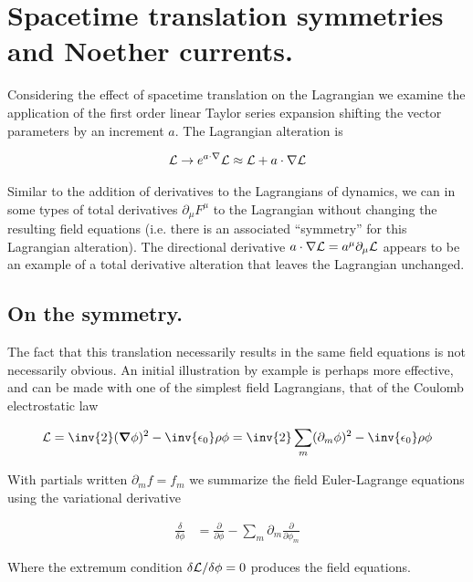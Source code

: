 \section{Spacetime translation symmetries and Noether currents.}

Considering the effect of spacetime translation on the Lagrangian we examine the application of the first order linear Taylor series expansion shifting the vector parameters by an increment $a$.  The Lagrangian alteration is

\begin{align}\label{eqn:rotationCurrents:goo1}
\mathcal{L} \rightarrow e^{a \cdot \nabla }\mathcal{L} \approx \mathcal{L} + a \cdot \nabla \mathcal{L}
\end{align}

Similar to the addition of derivatives to the Lagrangians of dynamics, we can in some types of total derivatives $\partial_\mu F^\mu$ to the Lagrangian without changing the resulting field equations (i.e. there is an associated ``symmetry'' for this Lagrangian alteration).  The directional derivative $a \cdot \nabla \mathcal{L} = a^\mu \partial_\mu \mathcal{L}$ appears to be an example of a total derivative alteration that leaves the Lagrangian unchanged.

\subsection{On the symmetry.}

The fact that this translation necessarily results in the same field equations is not necessarily obvious.  An initial illustration by example is perhaps more effective, and can be made with one of the simplest field Lagrangians, that of the Coulomb electrostatic law

\begin{align}\label{eqn:rotationCurrents:goo2}
\LL = \inv{2} (\spacegrad \phi)^2 - \inv{\epsilon_0}\rho \phi = \inv{2} \sum_m(\partial_m \phi)^2 - \inv{\epsilon_0}\rho \phi
\end{align}

With partials written $\partial_m f = f_m$ we summarize the field Euler-Lagrange equations using the variational derivative

\begin{align}\label{eqn:rotationCurrents:goo3}
\frac{\delta }{\delta \phi} &=
\frac{\partial }{\partial \phi} - \sum_m \partial_m \frac{\partial }{\partial \phi_m}
\end{align}

Where the extremum condition ${\delta \mathcal{L}}/{\delta \phi} = 0$ produces the field equations.

